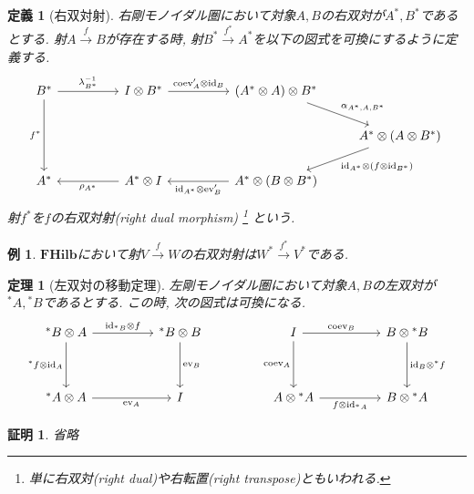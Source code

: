 \documentclass[a4paper,12pt]{ltjsarticle}
\theoremstyle{break}
\newtheorem{defn}[thm]{定義}
\newtheorem{thrm}[thm]{定理}
\newtheorem{eg}[thm]{例}
\newtheorem*{prf}{証明}
\newcommand{\fhilb}{\mathbf{FHilb}}
\newcommand{\xr}[1]{\xrightarrow{#1}}
\newcommand{\id}{\mathrm{id}}
\newcommand{\eva}{\mathrm{ev}}
\newcommand{\coev}{\mathrm{coev}}
\newcommand{\al}{\alpha}
\newcommand{\la}{\lambda}
\newcommand{\ot}{\otimes}
\numberwithin{equation}{section}
\begin{document}
\begin{defn}[右双対射]
  右剛モノイダル圏において対象$A,B$の右双対が$A^*,B^*$であるとする. 
  射$A \xr{f} B$が存在する時, 射$B^* \xr{f^*} A^*$を以下の図式を可換にするように定義する. 
  \[\begin{tikzcd}
    {B^*} && {I \ot B^*} && {(A^* \ot A) \ot B^*} \\
    &&&&& {A^* \ot (A \ot B^*)} \\
    {A^*} && {A^* \ot I} && {A^* \ot (B \ot B^*)}
    \arrow["{\coev'_A \ot \id_B}", from=1-3, to=1-5]
    \arrow["{\al_{A^*,A,B^*}}", from=1-5, to=2-6]
    \arrow["{\id_{A^*} \ot (f \ot \id_{B^*})}", from=2-6, to=3-5]
    \arrow["{\id_{A^*} \ot \eva'_B}", from=3-5, to=3-3]
    \arrow["{\la_{B^*}^{-1}}", from=1-1, to=1-3]
    \arrow["{f^*}"', from=1-1, to=3-1]
    \arrow["{\rho_{A^*}}", from=3-3, to=3-1]
  \end{tikzcd}\]
  射$f^*$を$f$の右双対射(right dual morphism)
  \footnote{
    単に右双対(right dual)や右転置(right transpose)ともいわれる. 
  }
  という. 
\end{defn}

\begin{eg}
  $\fhilb$において射$V \xr{f} W$の右双対射は$W^* \xr{f^*} V^*$である. 
\end{eg}

\begin{thrm}[左双対の移動定理]
  左剛モノイダル圏において対象$A,B$の左双対が${}^*A,{}^*B$であるとする. 
  この時, 次の図式は可換になる. 
  \[\begin{tikzcd}
    {{}^*B \ot A} && {{}^*B \ot B} && I && {B \ot {}^*B} \\
    \\
    {{}^*A \ot A} && I && {A \ot {}^*A} && {B \ot {}^*A}
    \arrow["{\id_{{}^*B} \ot f}", from=1-1, to=1-3]
    \arrow["{{}^*f \ot \id_A}"', from=1-1, to=3-1]
    \arrow["{\eva_A}"', from=3-1, to=3-3]
    \arrow["{\eva_B}", from=1-3, to=3-3]
    \arrow["{\coev_B}", from=1-5, to=1-7]
    \arrow["{\coev_A}"', from=1-5, to=3-5]
    \arrow["{f \ot \id_{{}^*A}}"', from=3-5, to=3-7]
    \arrow["{\id_B \ot {}^*f}", from=1-7, to=3-7]
  \end{tikzcd}\]
\end{thrm}

\begin{prf}
  省略
\end{prf}
\end{document}
